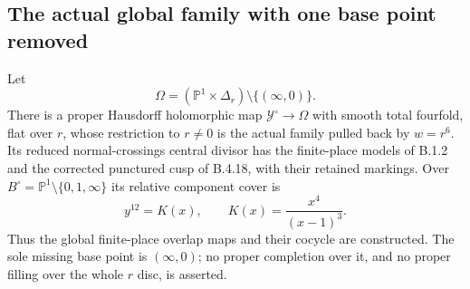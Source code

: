 \subsection{The actual global family with one base point removed}

\begin{proposition}
\label{push:B419}
Let
\[
 \Omega=(\mathbb P^1\times\Delta_r)
                  \setminus\{(\infty,0)\}.
\]
There is a proper Hausdorff holomorphic map
$\mathcal Y^\circ\to\Omega$ with smooth total fourfold,
flat over $r$, whose restriction to $r\ne0$ is the
actual family pulled back by $w=r^6$. Its reduced
normal-crossings central divisor has the finite-place
models of B.1.2 and the corrected punctured cusp of
B.4.18, with their retained markings. Over
$B^\circ=\mathbb P^1\setminus\{0,1,\infty\}$ its
relative component cover is
\[
 y^{12}=K(x),\qquad K(x)=\frac{x^4}{(x-1)^3}.
\]
Thus the global finite-place overlap maps and their
cocycle are constructed. The sole missing base point
is $(\infty,0)$; no proper completion over it, and no
proper filling over the whole $r$ disc, is asserted.
\end{proposition}

